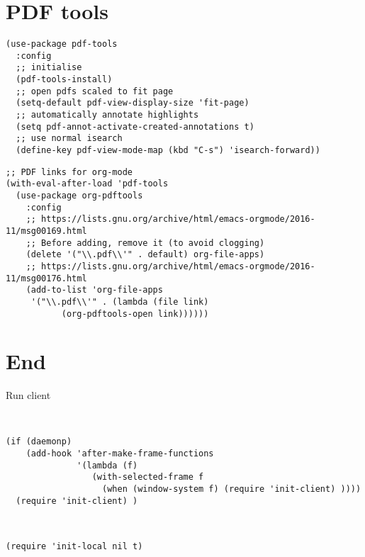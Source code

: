 \documentclass[12pt]{article}
\begin{document}
\section{PDF tools}
\label{sec:org28c8d15}

\begin{verbatim}
(use-package pdf-tools
  :config
  ;; initialise
  (pdf-tools-install)
  ;; open pdfs scaled to fit page
  (setq-default pdf-view-display-size 'fit-page)
  ;; automatically annotate highlights
  (setq pdf-annot-activate-created-annotations t)
  ;; use normal isearch
  (define-key pdf-view-mode-map (kbd "C-s") 'isearch-forward))
\end{verbatim}

\begin{verbatim}
;; PDF links for org-mode
(with-eval-after-load 'pdf-tools
  (use-package org-pdftools
    :config
    ;; https://lists.gnu.org/archive/html/emacs-orgmode/2016-11/msg00169.html
    ;; Before adding, remove it (to avoid clogging)
    (delete '("\\.pdf\\'" . default) org-file-apps)
    ;; https://lists.gnu.org/archive/html/emacs-orgmode/2016-11/msg00176.html
    (add-to-list 'org-file-apps
     '("\\.pdf\\'" . (lambda (file link)
           (org-pdftools-open link))))))
\end{verbatim}


\section{End}
\label{sec:orgc6899b1}


Run client

\begin{verbatim}


(if (daemonp)
    (add-hook 'after-make-frame-functions
              '(lambda (f)
                 (with-selected-frame f
                   (when (window-system f) (require 'init-client) ))))
  (require 'init-client) )



\end{verbatim}

\begin{verbatim}
(require 'init-local nil t)
\end{verbatim}
\end{document}
